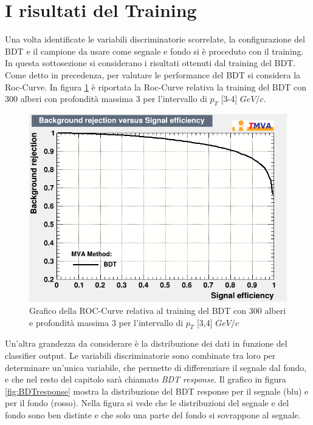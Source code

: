 \section{I risultati del Training}

Una volta identificate le variabili discriminatorie scorrelate, la configurazione del BDT e il campione da usare come segnale e fondo si è proceduto con il training. In questa sottosezione si considerano i risultati ottenuti dal training del BDT. 
\\Come detto in precedenza, per valutare le performance del BDT si considera la Roc-Curve. In figura \ref{fig:RocCurve} è riportata la Roc-Curve relativa la training del BDT con 300 alberi con profondità massima 3 per l'intervallo di $p_T$ [3-4] $GeV/c$. 

    \begin{figure}[htbp] 
        \centering
        \includegraphics[width=0.7\linewidth]{training&testing/RocCurve.png}
        \caption{Grafico della ROC-Curve relativa al training del BDT con 300 alberi e profondità massima 3 per l'intervallo di $p_T$ [3,4] $GeV/c$}
        \label{fig:RocCurve}
    \end{figure}
    
    
Un'altra grandezza da considerare è la distribuzione dei dati in funzione del classifier output. Le variabili discriminatorie sono combinate tra loro per determinare un'unica variabile, che permette di differenziare il segnale dal fondo, e che nel resto del capitolo sarà chiamato \textit{BDT response}. Il grafico in figura \ref{fig:BDTresponse} mostra la distribuzione del BDT response per il segnale (blu) e per il fondo (rosso). Nella figura si vede che le distribuzioni del segnale e del fondo sono ben distinte e che solo una parte del fondo si sovrappone al segnale. 

